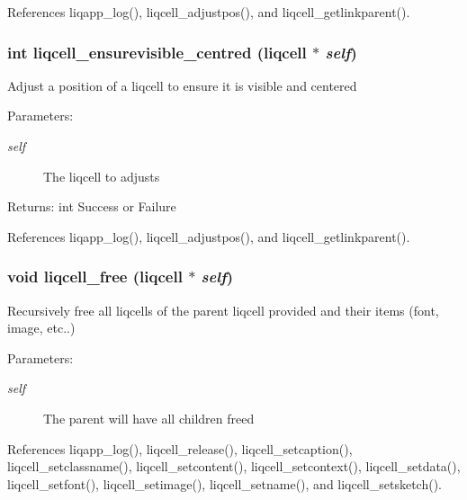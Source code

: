 References liqapp\_\-log(), liqcell\_\-adjustpos(), and liqcell\_\-getlinkparent().
\subsubsection[{liqcell\_\-ensurevisible\_\-centred}]{\setlength{\rightskip}{0pt plus 5cm}int liqcell\_\-ensurevisible\_\-centred (liqcell $\ast$ {\em self})}\label{d5/da2/liqcell_8c_d8b07805ce7c40303791f49fdb1ff8a4}


Adjust a position of a liqcell to ensure it is visible and centered \begin{Desc}
\item[Parameters:]
\begin{description}
\item[{\em self}]The liqcell to adjusts \end{description}
\end{Desc}
\begin{Desc}
\item[Returns:]int Success or Failure \end{Desc}


References liqapp\_\-log(), liqcell\_\-adjustpos(), and liqcell\_\-getlinkparent().
\subsubsection[{liqcell\_\-free}]{\setlength{\rightskip}{0pt plus 5cm}void liqcell\_\-free (liqcell $\ast$ {\em self})}\label{d5/da2/liqcell_8c_1b82d40ff5b58d211691cfe18b936fba}


Recursively free all liqcells of the parent liqcell provided and their items (font, image, etc..) \begin{Desc}
\item[Parameters:]
\begin{description}
\item[{\em self}]The parent will have all children freed \end{description}
\end{Desc}


References liqapp\_\-log(), liqcell\_\-release(), liqcell\_\-setcaption(), liqcell\_\-setclassname(), liqcell\_\-setcontent(), liqcell\_\-setcontext(), liqcell\_\-setdata(), liqcell\_\-setfont(), liqcell\_\-setimage(), liqcell\_\-setname(), and liqcell\_\-setsketch().

